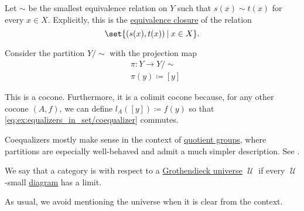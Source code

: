 \begin{example}
\begin{thmenum}
    Let \( {\sim} \) be the smallest equivalence relation on \( Y \) such that \( s(x) \sim t(x) \) for every \( x \in X \). Explicitly, this is the \hyperref[thm:equivalence_closure]{equivalence closure} of the relation
    \begin{equation*}
      \set{ (s(x), t(x)) \given x \in X }.
    \end{equation*}

    Consider the partition \( Y / {\sim} \) with the projection map
    \begin{equation*}
      \begin{aligned}
        &\pi: Y \to Y / {\sim} \\
        &\pi(y) \coloneqq [y]
      \end{aligned}
    \end{equation*}

    This is a cocone. Furthermore, it is a colimit cocone because, for any other cocone \( (A, f) \), we can define \( l_A([y]) \coloneqq f(y) \) so that \eqref{eq:ex:equalizers_in_set/coequalizer} commutes.

    Coequalizers mostly make sense in the context of \hyperref[def:group/quotient]{quotient groups}, where partitions are especially well-behaved and admit a much simpler description. See .
  \end{thmenum}
\end{example}

\begin{definition}\label{def:compete_category}
  We say that a category is  with respect to a \hyperref[def:grothendieck_universe]{Grothendieck universe} \( \mscrU \) if every \( \mscrU \)-small \hyperref[def:categorical_diagram]{diagram} has a limit.
\end{definition}
\begin{comments}
  \item As usual, we avoid mentioning the universe when it is clear from the context.
\end{comments}
